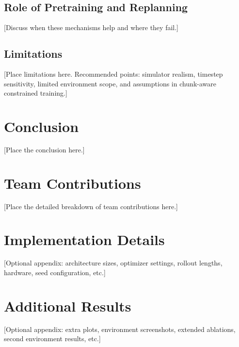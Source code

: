 \documentclass{article}
\begin{document}
\subsection{Role of Pretraining and Replanning}

[Discuss when these mechanisms help and where they fail.]

\subsection{Limitations}

[Place limitations here. Recommended points: simulator realism, timestep sensitivity, limited environment scope, and assumptions in chunk-aware constrained training.]

\section{Conclusion}

[Place the conclusion here.]

\section{Team Contributions}

[Place the detailed breakdown of team contributions here.]

\appendix

\section{Implementation Details}

[Optional appendix: architecture sizes, optimizer settings, rollout lengths, hardware, seed configuration, etc.]

\section{Additional Results}

[Optional appendix: extra plots, environment screenshots, extended ablations, second environment results, etc.]
\end{document}
